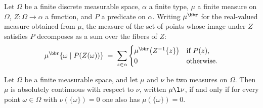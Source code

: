 \begin{theorem}
\label{CommunicationComplexity.FiniteMeasureSpace.measureReal_preimage_eq_sum_fibers}
\leanok
{}
Let $\Omega$ be a finite discrete measurable space, $\alpha$ a finite type, $\mu$ a
finite measure on $\Omega$, $Z : \Omega \to \alpha$ a function, and $P$ a predicate on
$\alpha$. Writing $\mu^{\bbr}$ for the real-valued measure obtained from $\mu$, the
measure of the set of points whose image under $Z$ satisfies $P$ decomposes as a sum
over the fibers of $Z$:
\[
  \mu^{\bbr}\{\omega \mid P(Z(\omega))\}
\;=\; \sum_{z \in \alpha} \begin{cases} \mu^{\bbr}\bigl(Z^{-1}\{z\}\bigr) & \text{if }
P(z), \\ 0 & \text{otherwise.} \end{cases}
\]
\end{theorem}

\begin{theorem}
\label{CommunicationComplexity.FiniteMeasureSpace.absolutelyContinuous_iff_forall_singletons}
\leanok
{}
Let $\Omega$ be a finite measurable space, and let $\mu$ and $\nu$ be two measures on
$\Omega$. Then $\mu$ is absolutely continuous with respect to $\nu$, written $\mu \l
\nu$, if and only if for every point $\omega \in \Omega$ with $\nu(\{\omega\}) = 0$ one
also has $\mu(\{\omega\}) = 0$.
\end{theorem}

